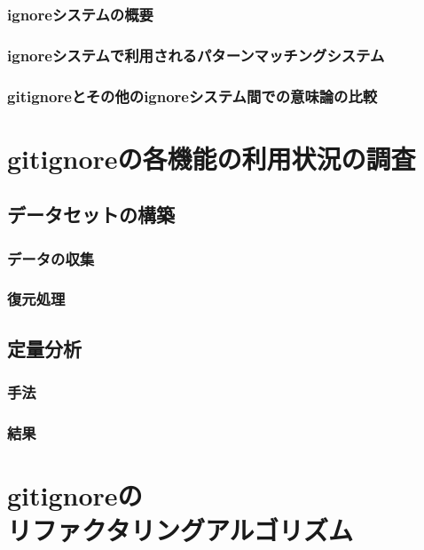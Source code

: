 \documentclass[a4paper,xelatex,ja=standard,fontsize=11pt]{bxjsreport}
\begin{document}
\subsection{\textrm{ignore}システムの概要}

\subsection{\textrm{ignore}システムで利用されるパターンマッチングシステム}

\subsection{\textrm{gitignore}とその他の\textrm{ignore}システム間での意味論の比較}

%
\chapter{\textrm{gitignore}の各機能の利用状況の調査}

\section{データセットの構築}

\subsection{データの収集}

\subsection{復元処理}

\section{定量分析}

\subsection{手法}

\subsection{結果}

%
\chapter[\textrm{gitignore}のリファクタリングアルゴリズム]{\textrm{gitignore}の\\リファクタリングアルゴリズム}
\end{document}
